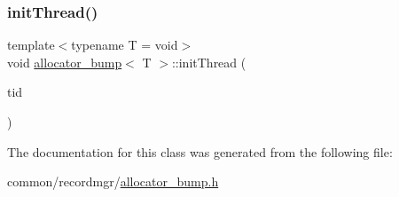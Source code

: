 \mbox{\label{classallocator__bump_ac363b41fc27681855131e6d7c6c31407}} 
\subsubsection{\texorpdfstring{init\+Thread()}{initThread()}}
{\footnotesize\ttfamily template$<$typename T  = void$>$ \\
void \hyperlink{classallocator__bump}{allocator\+\_\+bump}$<$ T $>$\+::init\+Thread (\begin{DoxyParamCaption}\item[{const int}]{tid }\end{DoxyParamCaption})\hspace{0.3cm}{\ttfamily [inline]}}



The documentation for this class was generated from the following file\+:\begin{DoxyCompactItemize}
\item 
common/recordmgr/\hyperlink{allocator__bump_8h}{allocator\+\_\+bump.\+h}\end{DoxyCompactItemize}
